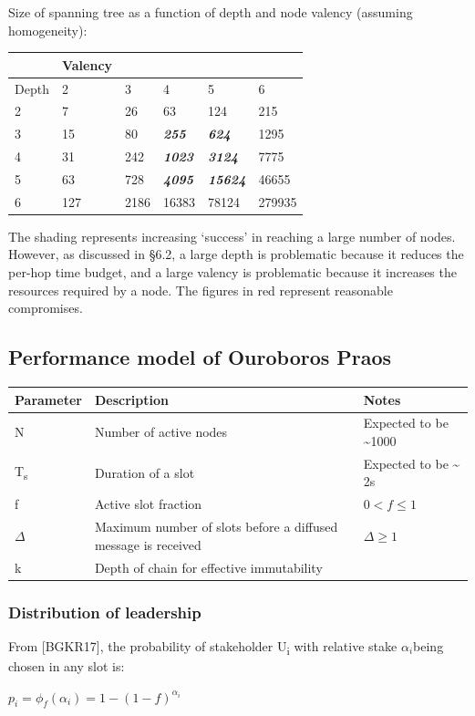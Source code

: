 \documentclass[11pt,a4paper]{article}
\begin{document}
Size of spanning tree as a function of depth and node valency (assuming
homogeneity):

\begin{longtable}[]{@{}llllll@{}}
\toprule
& Valency & & & &\tabularnewline
\midrule
\endhead
Depth & 2 & 3 & 4 & 5 & 6\tabularnewline
2 & 7 & 26 & 63 & 124 & 215\tabularnewline
3 & 15 & 80 & \emph{\textbf{255}} & \emph{\textbf{624}} &
1295\tabularnewline
4 & 31 & 242 & \emph{\textbf{1023}} & \emph{\textbf{3124}} &
7775\tabularnewline
5 & 63 & 728 & \emph{\textbf{4095}} & \emph{\textbf{15624}} &
46655\tabularnewline
6 & 127 & 2186 & 16383 & 78124 & 279935\tabularnewline
\bottomrule
\end{longtable}

The shading represents increasing `success' in reaching a large number
of nodes. However, as discussed in §6.2, a large depth is problematic
because it reduces the per-hop time budget, and a large valency is
problematic because it increases the resources required by a node. The
figures in red represent reasonable compromises.

\subsection{Performance model of Ouroboros Praos}
\label{performance-model-of-ouroboros-praos}

\begin{longtable}[]{@{}lll@{}}
\toprule
\textbf{Parameter} & \textbf{Description} &
\textbf{Notes}\tabularnewline
\midrule
\endhead
N & Number of active nodes & Expected to be
\textasciitilde{}1000\tabularnewline
T\textsubscript{s} & Duration of a slot & Expected to be
\textasciitilde{} 2s\tabularnewline
f & Active slot fraction & $0 < f \leq 1$\tabularnewline
$\Delta$ & Maximum number of slots before a diffused message is received & $\Delta \geq 1$\tabularnewline
k & Depth of chain for effective immutability &\tabularnewline
\bottomrule
\end{longtable}

\subsubsection{Distribution of leadership}
\label{distribution-of-leadership}

From {[}BGKR17{]}, the probability of stakeholder U\textsubscript{i}
with relative stake \(\alpha_{i}\)being chosen in any slot is:

\(p_{i} = {\phi_{f}\left( \alpha_{i} \right) = 1 - \left( 1 - f \right)^{\alpha_{i}}}_{}\)
\end{document}
